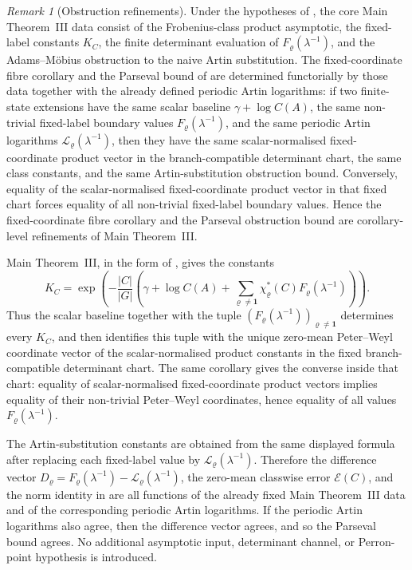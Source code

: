 \documentclass[11pt,a4paper]{amsart}
\theoremstyle{plain}
\theoremstyle{definition}
\theoremstyle{remark}
\newtheorem{remark}[theorem]{Remark}
\begin{document}
\begin{remark}[Obstruction refinements]
  Under the hypotheses of , the
  core Main Theorem~III data consist of the Frobenius-class product asymptotic, the
  fixed-label constants \(K_C\), the finite determinant evaluation of
  \(F_\varrho(\lambda^{-1})\), and the Adams--M\"obius obstruction to the
  naive Artin substitution.  The fixed-coordinate fibre corollary
   and the Parseval
  bound of  are determined functorially by
  those data together with the already defined periodic Artin logarithms:
  if two finite-state extensions have the same scalar baseline
  \(\gamma+\log C(A)\), the same non-trivial fixed-label boundary values
  \(F_\varrho(\lambda^{-1})\), and the same periodic Artin logarithms
  \(\mathcal L_\varrho(\lambda^{-1})\), then they have the same
  scalar-normalised fixed-coordinate product vector in the branch-compatible
  determinant chart, the same class constants, and the same
  Artin-substitution obstruction bound.  Conversely, equality of the
  scalar-normalised fixed-coordinate product vector in that fixed chart forces
  equality of all non-trivial fixed-label boundary values.  Hence the
  fixed-coordinate fibre corollary and the Parseval obstruction bound are
  corollary-level refinements of Main Theorem~III.
\end{remark}

Main Theorem~III, in the form of ,
gives the constants
  \[
    K_C=
    \exp\!\left(-\frac{|C|}{|G|}
      \left(\gamma+\log C(A)+
      \sum_{\varrho\ne\mathbf1}\chi_\varrho^\ast(C)
        F_\varrho(\lambda^{-1})\right)\right).
  \]
  Thus the scalar baseline together with the tuple
  \((F_\varrho(\lambda^{-1}))_{\varrho\ne\mathbf1}\) determines every
  \(K_C\), and  then
  identifies this tuple with the unique zero-mean Peter--Weyl coordinate
  vector of the scalar-normalised product constants in the fixed
  branch-compatible determinant chart.  The same corollary gives the converse
  inside that chart: equality of scalar-normalised fixed-coordinate product
  vectors implies
  equality of their non-trivial Peter--Weyl coordinates, hence equality of all
  values \(F_\varrho(\lambda^{-1})\).

  The Artin-substitution constants are obtained from the same displayed
  formula after replacing each fixed-label value by
  \(\mathcal L_\varrho(\lambda^{-1})\).  Therefore the difference vector
  \(D_\varrho=F_\varrho(\lambda^{-1})-
  \mathcal L_\varrho(\lambda^{-1})\), the zero-mean classwise error
  \(\mathcal E(C)\), and the norm identity in
   are all functions of the already fixed
  Main Theorem~III data and of the corresponding periodic Artin logarithms.
If the periodic Artin logarithms also agree, then the difference vector agrees,
and so the Parseval bound agrees.  No additional asymptotic input, determinant
channel, or Perron-point hypothesis is introduced.
\end{document}
